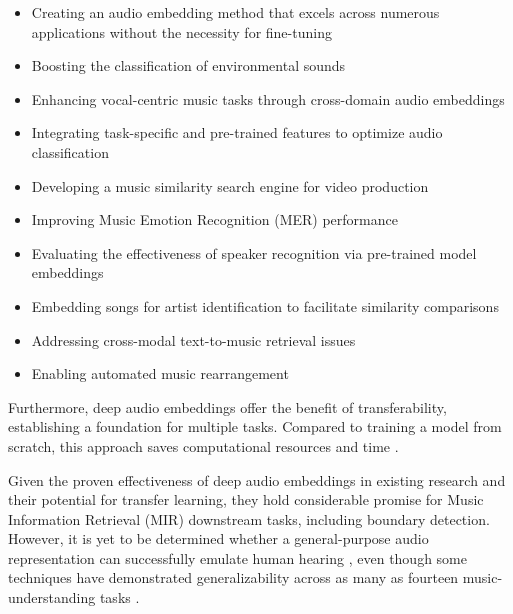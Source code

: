 \begin{itemize}
\item Creating an audio embedding method that excels across numerous applications without the necessity for fine-tuning \cite{Turian2022HEAR:Representations}
\item Boosting the classification of environmental sounds \cite{Kim2020OneStrategies, CramerLOOKEMBEDDINGS}
\item Enhancing vocal-centric music tasks through cross-domain audio embeddings \cite{Kim2021LearningLoss}
\item Integrating task-specific and pre-trained features to optimize audio classification \cite{Hung2022Feature-informedClassification}
\item Developing a music similarity search engine for video production \cite{epidemic}
\item Improving Music Emotion Recognition (MER) performance \cite{KohComparisonRecognition}
\item Evaluating the effectiveness of speaker recognition via pre-trained model embeddings \cite{lightweight}
\item Embedding songs for artist identification to facilitate similarity comparisons \cite{contentmusicsimtriplet2020}
\item Addressing cross-modal text-to-music retrieval issues \cite{WonEmotionStories}
\item Enabling automated music rearrangement \cite{Stoller2018IntuitiveTransitions, Plachouras2023MusicSegmentation}
\end{itemize}

Furthermore, deep audio embeddings offer the benefit of transferability, establishing a foundation for multiple tasks. Compared to training a model from scratch, this approach saves computational resources and time \cite{}.

Given the proven effectiveness of deep audio embeddings in existing research and their potential for transfer learning, they hold considerable promise for Music Information Retrieval (MIR) downstream tasks, including boundary detection. However, it is yet to be determined whether a general-purpose audio representation can successfully emulate human hearing \cite{Turian2022HEAR:Representations}, even though some techniques have demonstrated generalizability across as many as fourteen music-understanding tasks \cite{Li2023MERT:Training}.